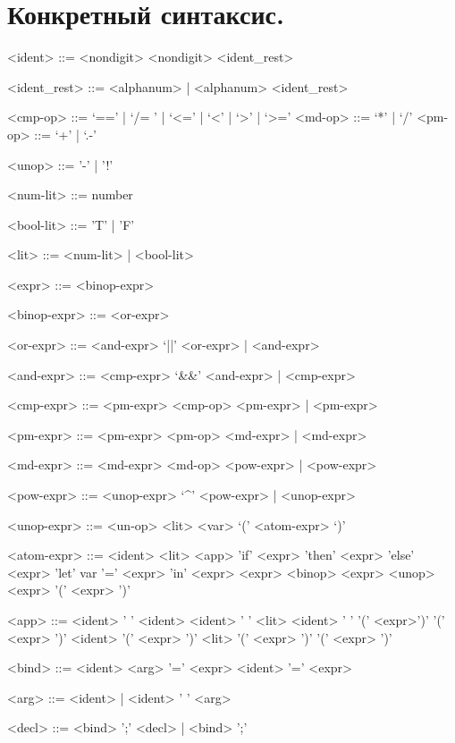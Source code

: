 \documentclass[12pt, a4paper] {ncc}
\begin{document}
\setcounter{figure}{0}

\section{Конкретный синтаксис.}
\begin{grammar}
<ident> ::= <nondigit>
\alt <nondigit> <ident_rest>

<ident_rest> ::= <alphanum> | <alphanum> <ident_rest>

<cmp-op> ::= `==' | `/= ' | `<=' | `<' | `>' | `>=' 
<md-op> ::= `*' | `/' 
<pm-op> ::= `+' | `.-' 

<unop> ::= '-' | '!'

<num-lit> ::= number

<bool-lit> ::= 'T' | 'F'

<lit> ::= <num-lit> | <bool-lit>

<expr> ::= <binop-expr>

<binop-expr> ::= <or-expr>

<or-expr> ::= <and-expr> `||' <or-expr> | <and-expr>

<and-expr> ::= <cmp-expr> `&&' <and-expr> | <cmp-expr>

<cmp-expr> ::= <pm-expr> <cmp-op> <pm-expr> | <pm-expr>

<pm-expr> ::= <pm-expr> <pm-op> <md-expr> | <md-expr>

<md-expr> ::= <md-expr> <md-op> <pow-expr> | <pow-expr>

<pow-expr> ::= <unop-expr> `^' <pow-expr> | <unop-expr>

<unop-expr> ::= <un-op> <lit>
 <var>
 `(' <atom-expr> `)'

<atom-expr> ::= <ident>
\alt <lit>
\alt <app>
\alt 'if' <expr> 'then' <expr> 'else' <expr>
\alt 'let' var '=' <expr> 'in' <expr>
\alt  <expr> <binop> <expr>
\alt <unop> <expr>
\alt '(' <expr> ')'

<app> ::=  <ident> ' ' <ident>
\alt <ident> ' ' <lit>
\alt <ident> ' ' '(' <expr>')'
\alt '(' <expr> ')' <ident>
\alt '(' <expr> ')' <lit>
\alt '(' <expr> ')' '(' <expr> ')'

<bind> ::= <ident> <arg> '=' <expr>
\alt <ident> '=' <expr>

<arg> ::= <ident> | <ident> ' ' <arg>

<decl> ::= <bind> ';' <decl> | <bind> ';'

\end{grammar}
\end{document}
